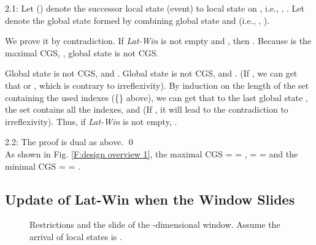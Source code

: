 \documentclass[12pt,journal,letterpaper,compsoc]{IEEEtran}
\begin{document}

2.1: Let  () denote the successor local state (event) to local state  on , i.e., , . Let  denote the global state formed by combining global state  and  (i.e., , ).

We prove it by contradiction. If {\it Lat-Win} is not empty and , then . Because  is the maximal CGS, , global state  is not CGS.

Global state  is not CGS,  and . Global state  is not CGS,  and . (If , we can get that  or , which is contrary to irreflexivity). By induction on the length of the set containing the used indexes (\{\} above), we can get that to the last global state , the set contains all the indexes, and  (If , it will lead to the contradiction to irreflexivity). Thus, if {\it Lat-Win} is not empty, .

2.2: The proof is dual as above. \qed \\

As shown in Fig. \ref{F:design overview 1}, the maximal CGS  =  = ,  =  =  and the minimal CGS  =  = .

\subsection{Update of Lat-Win when the Window Slides}

\begin{figure}[htbp]
    \hspace*{\fill}
    \hspace*{\fill}
    \hspace*{\fill}
    \caption{Restrictions and the slide of the -dimensional window. Assume the arrival of local states is .}
    \label{F:examples}
\end{figure}
\end{document}
